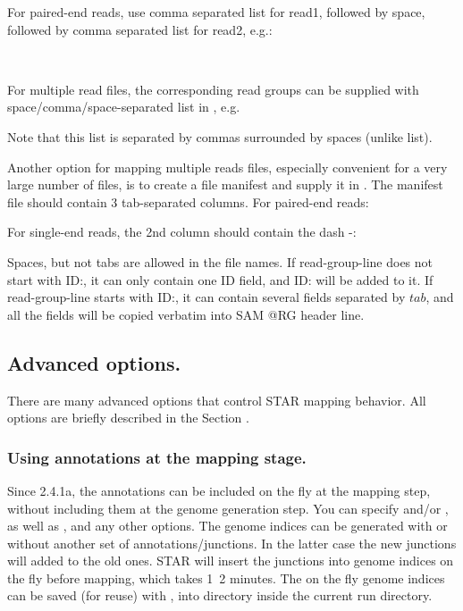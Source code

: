 \documentclass[12pt]{article}
\begin{document}
 

For paired-end reads, use comma separated list
for read1, followed by space, followed by comma separated list for read2, e.g.:

~

For multiple read files, the corresponding read groups can be supplied with space/comma/space-separated list in , e.g.

 

Note that this list is separated by commas surrounded by spaces (unlike  list).

Another option for mapping multiple reads files, especially convenient for a very large number of files, is to create a file manifest and supply it in  .
The manifest file should contain 3 tab-separated columns. For paired-end reads:


For single-end reads, the 2nd column should contain the dash -:


Spaces, but not tabs are allowed in the file names.
If read-group-line does not start with ID:, it can only contain one ID field, and ID: will be added to it.
If read-group-line starts with ID:, it can contain several fields separated by $tab$, and all the fields will be copied verbatim into SAM @RG header line.

\subsection{Advanced options.}
There are many advanced options that control STAR mapping behavior. All options are briefly described in the Section .

\subsubsection{Using annotations at the mapping stage.}
Since 2.4.1a, the annotations can be included on the fly at the mapping step, without including them at the genome generation step. You can specify   and/or  , as well as , and any other  options. The genome indices can be generated with or  without another set of annotations/junctions. In the latter case the new junctions will added to the old ones. STAR will insert the junctions into genome indices on the fly before mapping, which takes 1~2 minutes. The on the fly genome indices can be saved (for reuse) with  , into  directory inside the current run directory.
\end{document}
